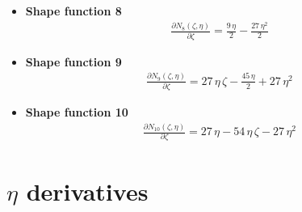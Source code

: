 \documentclass{article}
\begin{document}
\begin{itemize}
	
	\item \textbf{Shape function 8}\newline
	\begin{align}
	\frac{\partial N_8(\zeta, \eta)}{\partial \zeta} = \frac{9\,\eta }{2}-\frac{27\,\eta ^2}{2}
	\end{align}
	
	
	\item \textbf{Shape function 9}\newline
	\begin{align}
	\frac{\partial N_9(\zeta, \eta)}{\partial \zeta} = 27\,\eta \,\zeta-\frac{45\,\eta }{2}+27\,\eta ^2
	\end{align}
	
	
	\item \textbf{Shape function 10}\newline
	\begin{align}
	\frac{\partial N_{10}(\zeta, \eta)}{\partial \zeta} = 27\,\eta -54\,\eta \,\zeta-27\,\eta ^2
	\end{align}
\end{itemize}




\section{$\eta$ derivatives}
\end{document}
